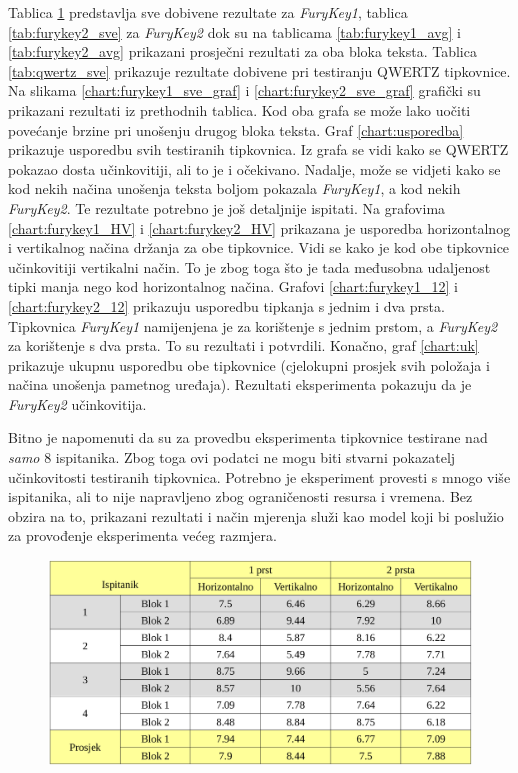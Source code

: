 \documentclass[times, utf8, zavrsni]{fer}
\begin{document}
Tablica \ref{tab:furykey1_sve} predstavlja sve dobivene rezultate za \emph{FuryKey1}, tablica \ref{tab:furykey2_sve} za \emph{FuryKey2} dok su na tablicama \ref{tab:furykey1_avg} i \ref{tab:furykey2_avg} prikazani prosječni rezultati za oba bloka teksta. Tablica \ref{tab:qwertz_sve} prikazuje rezultate dobivene pri testiranju QWERTZ tipkovnice.
Na slikama \ref{chart:furykey1_sve_graf} i \ref{chart:furykey2_sve_graf} grafički su prikazani rezultati iz prethodnih tablica. Kod oba grafa se može lako uočiti povećanje brzine pri unošenju drugog bloka teksta. Graf \ref{chart:usporedba} prikazuje usporedbu svih testiranih tipkovnica. Iz grafa se vidi kako se QWERTZ pokazao dosta učinkovitiji, ali to je i očekivano. Nadalje, može se vidjeti kako se kod nekih načina unošenja teksta boljom pokazala \emph{FuryKey1}, a kod nekih \emph{FuryKey2}. Te rezultate potrebno je još detaljnije ispitati. Na grafovima \ref{chart:furykey1_HV} i \ref{chart:furykey2_HV} prikazana je usporedba horizontalnog i vertikalnog načina držanja za obe tipkovnice. Vidi se kako je kod obe tipkovnice učinkovitiji vertikalni način. To je zbog toga što je tada međusobna udaljenost tipki manja nego kod horizontalnog načina. Grafovi \ref{chart:furykey1_12} i \ref{chart:furykey2_12} prikazuju usporedbu tipkanja s jednim i dva prsta. Tipkovnica \emph{FuryKey1} namijenjena je za korištenje s jednim prstom, a \emph{FuryKey2} za korištenje s dva prsta. To su rezultati i potvrdili. Konačno, graf \ref{chart:uk} prikazuje ukupnu usporedbu obe tipkovnice (cjelokupni prosjek svih položaja i načina unošenja pametnog uređaja). Rezultati eksperimenta pokazuju da je \emph{FuryKey2} učinkovitija.

Bitno je napomenuti da su za provedbu eksperimenta tipkovnice testirane nad \emph{samo} 8 ispitanika. Zbog toga ovi podatci ne mogu biti stvarni pokazatelj učinkovitosti testiranih tipkovnica. Potrebno je eksperiment provesti s mnogo više ispitanika, ali to nije napravljeno zbog ograničenosti resursa i vremena. Bez obzira na to, prikazani rezultati i način mjerenja služi kao model koji bi poslužio za provođenje eksperimenta većeg razmjera.

\begin{figure}[htb]
\centering
\includegraphics[width=12cm]{img/furykey1_sve.png}
\label{tab:furykey1_sve}
\end{figure}
\end{document}
